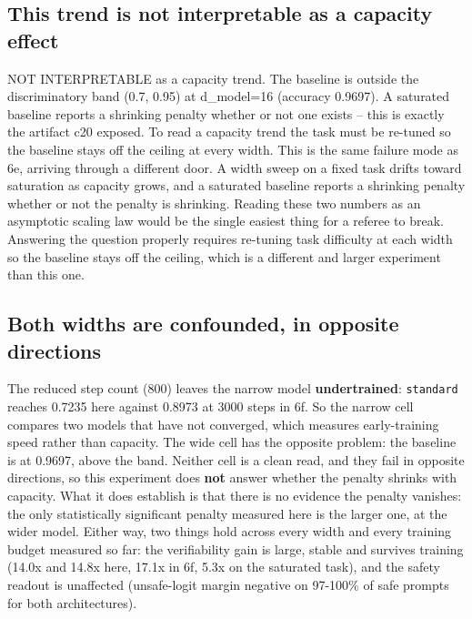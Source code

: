 \documentclass[sn-nature,pdflatex]{sn-jnl}
\begin{document}
\subsection{This trend is not interpretable as a capacity effect}
NOT INTERPRETABLE as a capacity trend. The baseline is outside the discriminatory band (0.7, 0.95) at d\_model=16 (accuracy 0.9697). A saturated baseline reports a shrinking penalty whether or not one exists -- this is exactly the artifact c20 exposed. To read a capacity trend the task must be re-tuned so the baseline stays off the ceiling at every width.
This is the same failure mode as 6e, arriving through a different door. A width sweep on a fixed task drifts toward saturation as capacity grows, and a saturated baseline reports a shrinking penalty whether or not the penalty is shrinking. Reading these two numbers as an asymptotic scaling law would be the single easiest thing for a referee to break. Answering the question properly requires re-tuning task difficulty at each width so the baseline stays off the ceiling, which is a different and larger experiment than this one.
\subsection{Both widths are confounded, in opposite directions}
The reduced step count (800) leaves the narrow model \textbf{undertrained}: \texttt{standard} reaches 0.7235 here against 0.8973 at 3000 steps in 6f. So the narrow cell compares two models that have not converged, which measures early-training speed rather than capacity. The wide cell has the opposite problem: the baseline is at 0.9697, above the band.
Neither cell is a clean read, and they fail in opposite directions, so this experiment does \textbf{not} answer whether the penalty shrinks with capacity. What it does establish is that there is no evidence the penalty vanishes: the only statistically significant penalty measured here is the larger one, at the wider model.
Either way, two things hold across every width and every training budget measured so far: the verifiability gain is large, stable and survives training (14.0x and 14.8x here, 17.1x in 6f, 5.3x on the saturated task), and the safety readout is unaffected (unsafe-logit margin negative on 97-100\% of safe prompts for both architectures).
\end{document}
